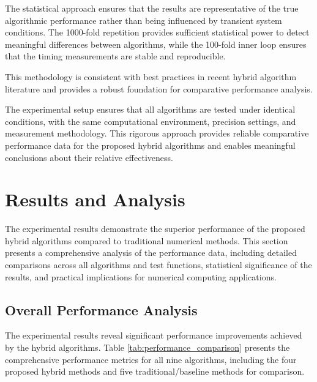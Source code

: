 \documentclass[amsmath, amssymb, aps]{revtex4-2}
\begin{document}
The statistical approach ensures that the results are representative of the true algorithmic performance rather than being influenced by transient system conditions. The 1000-fold repetition provides sufficient statistical power to detect meaningful differences between algorithms, while the 100-fold inner loop ensures that the timing measurements are stable and reproducible.

This methodology is consistent with best practices in recent hybrid algorithm literature \cite{sabharwal2019blended, badr2022novel} and provides a robust foundation for comparative performance analysis.

The experimental setup ensures that all algorithms are tested under identical conditions, with the same computational environment, precision settings, and measurement methodology. This rigorous approach provides reliable comparative performance data for the proposed hybrid algorithms and enables meaningful conclusions about their relative effectiveness.

\section{Results and Analysis}\label{sec:results}

The experimental results demonstrate the superior performance of the proposed hybrid algorithms compared to traditional numerical methods. This section presents a comprehensive analysis of the performance data, including detailed comparisons across all algorithms and test functions, statistical significance of the results, and practical implications for numerical computing applications.

\subsection{Overall Performance Analysis}

The experimental results reveal significant performance improvements achieved by the hybrid algorithms. Table \ref{tab:performance_comparison} presents the comprehensive performance metrics for all nine algorithms, including the four proposed hybrid methods and five traditional/baseline methods for comparison.
\end{document}
